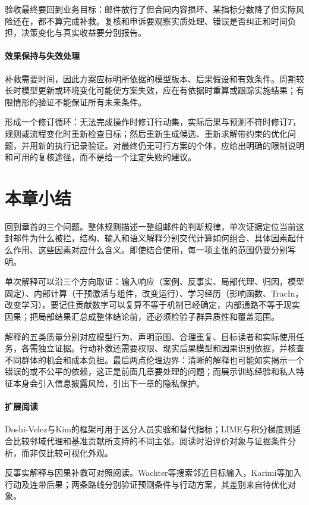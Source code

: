 验收最终要回到业务目标：邮件放行了但合同内容损坏、某指标分数降了但实际风险还在，都不算完成补救。复核和申诉要观察实质处理、错误是否纠正和时间负担，决策变化与真实收益要分别报告。

\paragraph{效果保持与失效处理}

补救需要时间，因此方案应标明所依据的模型版本、后果假设和有效条件。周期较长时模型更新或环境变化可能使方案失效，应在有依据时重算或跟踪实施结果；有限情形的验证不能保证所有未来条件。

形成一个修订循环：无法完成操作时修订行动集，实际后果与预测不符时修订$T$，规则或流程变化时重新检查目标；然后重新生成候选、重新求解带约束的优化问题，并用新的执行记录验证。对最终仍无可行方案的个体，应给出明确的限制说明和可用的复核途径，而不是给一个注定失败的建议。

\section{本章小结}
\label{sec:interpretability-summary}

回到章首的三个问题。整体规则描述一整组邮件的判断规律，单次证据定位当前这封邮件为什么被拦，结构、输入和语义解释分别交代计算如何组合、具体因素起什么作用、这些因素对应什么含义。即使结合使用，每一项主张的范围仍要分别写明。

单次解释可以沿三个方向取证：输入响应（案例、反事实、局部代理、归因，模型固定）、内部计算（干预激活与组件，改变运行）、学习经历（影响函数、TracIn，改变学习）。要记住贡献数字可以复算不等于机制已经确定，内部通路不等于现实因果；把局部结果汇总成整体结论前，还必须检验子群异质性和覆盖范围。

解释的五类质量分别对应模型行为、声明范围、合理重复、目标读者和实际使用任务，各需独立证据。行动补救还需要权限、现实后果模型和因果识别依据，并核查不同群体的机会和成本负担。最后两点伦理边界：清晰的解释也可能如实揭示一个错误的或不公平的依赖，这正是前面几章要处理的问题；而展示训练经验和私人特征本身会引入信息披露风险，引出下一章的隐私保护。

\paragraph{扩展阅读}

Doshi-Velez与Kim的框架可用于区分人员实验和替代指标；LIME与积分梯度则适合比较邻域代理和基准贡献所支持的不同主张。阅读时沿评价对象与证据条件分析，而非仅比较可视化外观。

反事实解释与因果补救可对照阅读。Wachter等搜索邻近目标输入，Karimi等加入行动及连带后果；两条路线分别验证预测条件与行动方案，其差别来自待优化对象。
